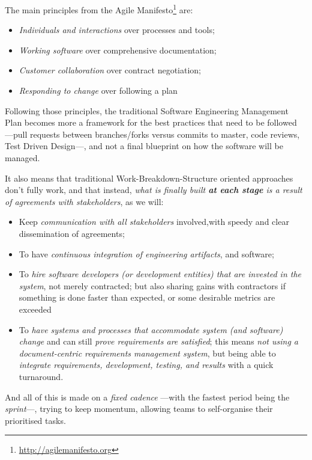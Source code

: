 \documentclass[11pt,twoside]{article}
\begin{document}
The main principles from the Agile Manifesto\footnote{\url{http://agilemanifesto.org}} are:

\begin{itemize}
	\item \emph{Individuals and interactions} over processes and tools;
	\item \emph{Working software} over comprehensive documentation;
	\item \emph{Customer collaboration} over contract negotiation;
	\item \emph{Responding to change} over following a plan
\end{itemize}

Following those principles, the traditional Software Engineering Management Plan becomes more a framework for the best practices that need to be followed ---pull requests between branches/forks versus commits to master, code reviews, Test Driven Design---, and not a final blueprint on how the software will be managed.

It also means that traditional Work-Breakdown-Structure oriented approaches don't fully work, and that instead, \emph{what is finally built \textbf{at each stage} is a result of agreements with stakeholders}, as we will:
\begin{itemize}
	\item Keep \emph{communication with all stakeholders} involved,with speedy and clear dissemination of agreements;
	\item To have \emph{continuous integration of engineering artifacts}, and software;
	\item To \emph{hire software developers (or development entities) that are invested in the system}, not merely contracted; but also sharing gains with contractors if something is done faster than expected, or some desirable metrics are exceeded	
	\item To \emph{have systems and processes that accommodate system (and software) change} and can still \emph{prove requirements are satisfied}; this means \emph{not using a document-centric requirements management system}, but being able to \emph{integrate requirements, development, testing, and results} with a quick turnaround.	
\end{itemize}

And all of this is made on a \emph{fixed cadence} ---with the fastest period being the \emph{sprint}---, trying to keep momentum, allowing teams to self-organise their prioritised tasks.
\end{document}
